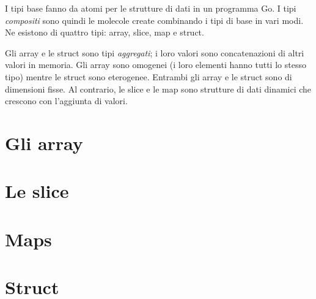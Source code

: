 I tipi base fanno da atomi per le strutture di dati in un programma Go.
I tipi \textit{compositi} sono quindi le molecole create combinando i tipi di base in vari modi.
Ne esistono di quattro tipi: array, slice, map e struct.

Gli array e le struct sono tipi \textit{aggregati};
i loro valori sono concatenazioni di altri valori in memoria.
Gli array sono omogenei (i loro elementi hanno tutti lo stesso tipo) mentre le struct sono eterogenee.
Entrambi gli array e le struct sono di dimensioni fisse.
Al contrario, le slice e le map sono strutture di dati dinamici che crescono con l'aggiunta di valori.


\section{Gli array}
\label{sec:gli_array}


\section{Le slice}
\label{sec:le_slice}


\section{Maps}
\label{sec:maps}


\section{Struct}
\label{sec:struct}


